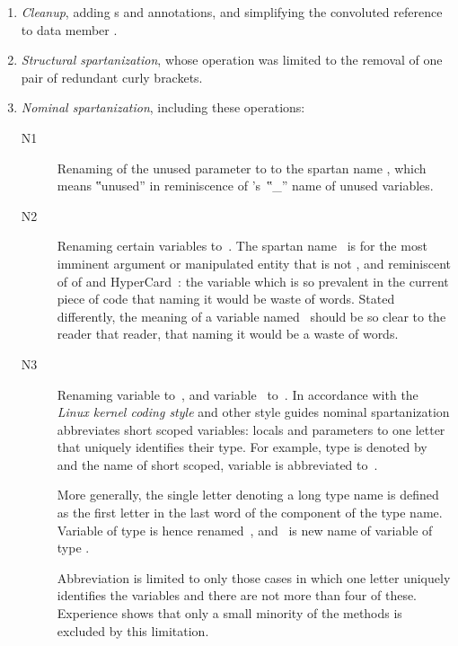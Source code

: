 \begin{enumerate}
  \item \emph{Cleanup}, adding s and  annotations,
      and simplifying the convoluted reference to data member .
    \item \emph{Structural spartanization}, whose operation was limited to the
      removal of one pair of redundant curly brackets.
    \item \emph{Nominal spartanization}, including these operations:
      \begin{description}
        \item[N1] Renaming of the unused
      parameter  to  to the spartan name
      \cc{\_\_}, which means ‟unused” in reminiscence of \Prolog's~‟\cc\_”
      name of unused variables.
    \item[N2] Renaming certain variables to~. The
      spartan name~ is for the most imminent argument or manipulated
      entity that is not , and reminiscent of  of \ML and
        \matteo HyperCard~\cite{there:must:be:some:citation:in:our:huge:bib:repository}:
        the variable which is so prevalent in the current piece of code that
        naming it would be waste of words. Stated differently, the
        meaning of a variable named~ should be so clear to the reader that
        reader, that naming it would be a waste of words.

      \item[N3] Renaming variable  to~, and variable~
        to~. In accordance with the \emph{Linux kernel coding style}%
        and other style guides nominal spartanization abbreviates short scoped
        variables: locals and parameters to one letter that uniquely identifies
        their type. For example, type  is denoted by~ and the
        name of short scoped, variable  is abbreviated to~.

        More generally, the single letter denoting a long type name is defined
        as the first letter in the last word of the component of the type name.
        Variable  of type  is hence renamed~,
        and~ is new name of variable  of type .

        Abbreviation is limited to only those cases in which one letter
        uniquely identifies the variables and there are not more than four of
        these. Experience shows that only a small minority of the methods is
        excluded by this limitation.
\end{description}
  \end{enumerate}

